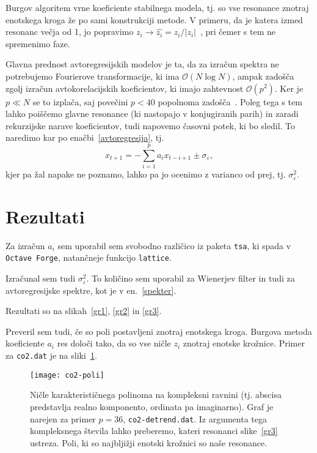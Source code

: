 \documentclass[a4 paper, 12pt]{article}
\newcommand{\e}{
	\ensuremath{\varepsilon}
}
\begin{document}
Burgov algoritem vrne koeficiente stabilnega modela, tj. so vse resonance znotraj enotskega kroga
\v ze po sami konstrukciji metode. V primeru, da je katera izmed resonanc ve\v cja od 1, jo popravimo
$z_i \to \hat{z_i} = z_i/|z_i|$~\cite[str. 305]{sirca}, pri \v cemer s tem ne spremenimo faze.

Glavna prednost avtoregresijskih modelov je ta, da za izra\v cun spektra ne potrebujemo Fourierove transformacije,
ki ima $\mathcal{O}(N \log N)$, ampak zado\v s\v ca zgolj izra\v cun avtokorelacijskih koeficientov, ki imajo
zahtevnost $\mathcal{O}(p^2)$. Ker je $p \ll N$ se to izpla\v ca, saj pove\v cini $p < 40$ popolnoma
zado\v s\v ca~\cite[str. 309]{sirca}. Poleg tega s tem lahko poi\v s\v cemo glavne resonance (ki nastopajo v
konjugiranih parih) in zaradi rekurzijske narave koeficientov, tudi napovemo \v casovni potek, ki bo sledil.
To naredimo kar po ena\v cbi~\eqref{avtoregresija}, tj.
\begin{equation}
	x_{t+1} = -\sum_{i = 1}^p a_i x_{t - i + 1} \pm \sigma_\e,
	\label{napoved}
\end{equation}
kjer pa \v zal napake ne poznamo, lahko pa jo ocenimo z varianco od prej, tj. $\sigma^2_\e$.

\section{Rezultati}
Za izra\v cun ${a_i}$ sem uporabil sem svobodno razli\v cico iz paketa {\tt tsa}, ki spada v {\tt Octave Forge},
natan\v cneje funkcijo {\tt lattice}.

Izra\v cunal sem tudi $\sigma_\e^2$. To koli\v cino sem uporabil za Wienerjev filter in tudi za avtoregresijske
spektre, kot je v en.~\eqref{spekter}.

Rezultati so na slikah~\ref{gr1}, \ref{gr2} in \ref{gr3}.

Preveril sem tudi, \v ce so poli postavljeni znotraj enotskega kroga. Burgova metoda koeficiente $a_i$ res dolo\v ci
tako, da so vse ni\v cle $z_i$ znotraj enotske kro\v znice. Primer za {\tt co2.dat} je na sliki~\ref{graf0}.

\begin{figure}[H]\centering
	\texttt{[image: co2-poli]}
	\caption{Ni\v cle karakteristi\v cnega polinoma na kompleksni ravnini (tj. abscisa predstavlja realno komponento,
		ordinata pa imaginarno). Graf je narejen za primer $p = 36$, {\tt co2-detrend.dat}. Iz argumenta tega
		kompleksnega \v stevila lahko preberemo, kateri resonanci slike~\ref{gr3} ustreza. Poli, ki so
		najblji\v zji enotski kro\v znici so na\v se resonance.}
	\label{graf0}
\end{figure}
\end{document}

